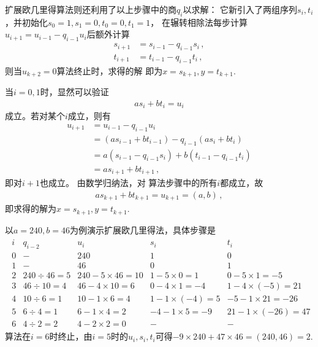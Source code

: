扩展欧几里得算法则还利用了以上步骤中的商$q_i$以求解：
它新引入了两组序列$s_i,t_i$，并初始化$s_0=1,s_1=0,t_0=0,t_1=1$，
在辗转相除法每步计算$u_{i+1}=u_{i-1}-q_{i-1}u_i$后额外计算
\begin{align}
    s_{i+1} & =s_{i-1}-q_{i-1}s_i\, , \\
    t_{i+1} & =t_{i-1}-q_{i-1}t_i\, ,
\end{align}
则当$u_{k+2}=0$算法终止时，求得的解
即为$x=s_{k+1},y=t_{k+1}$.
\begin{prove}
    当$i=0,1$时，显然可以验证
    \begin{align}\label{eq:7.ex02.ExtendedEuclidean-prove-01}
        as_i+bt_i=u_i
    \end{align}
    成立。若对某个$i$成立，则有
    \begin{align}
        u_{i+1} & =u_{i-1}-q_{i-1}u_i\nonumber                          \\
                & =(as_{i-1}+bt_{i-1})-q_{i-1}(as_i+bt_i)\nonumber      \\
                & =a(s_{i-1}-q_{i-1}s_i)+b(t_{i-1}-q_{i-1}t_i)\nonumber \\
                & =as_{i+1}+bt_{i+1}\, ,
    \end{align}
    即对$i+1$也成立。
    由数学归纳法，对
    算法步骤中的所有$i$都成立，故
    \begin{align}
        as_{k+1}+bt_{k+1}=u_{k+1}=(a,b)\, ,
    \end{align}
    即求得的解为$x=s_{k+1},y=t_{k+1}$.
\end{prove}
\begin{example}
    以$a=240,b=46$为例演示扩展欧几里得法，具体步骤是
    \begin{align}
        \begin{array}{lrrrr}
            i & q_{i-2}     & u_i              & s_i             & t_i                \\
            0 & -           & 240              & 1               & 0                  \\
            1 & -           & 46               & 0               & 1                  \\
            2 & 240\div46=5 & 240-5\times46=10 & 1-5\times0=1    & 0-5\times1=-5      \\
            3 & 46\div10=4  & 46-4\times10=6   & 0-4\times1=-4   & 1-4\times(-5)=21   \\
            4 & 10\div6=1   & 10-1\times6=4    & 1-1\times(-4)=5 & -5-1\times21=-26   \\
            5 & 6\div4=1    & 6-1\times4=2     & -4-1\times5=-9  & 21-1\times(-26)=47 \\
            6 & 4\div2=2    & 4-2\times2=0     & -               & -
        \end{array}\nonumber
    \end{align}
    算法在$i=6$时终止，由$i=5$时的$u_i,s_i,t_i$可得$-9\times240+47\times46=(240,46)=2$.
\end{example}

